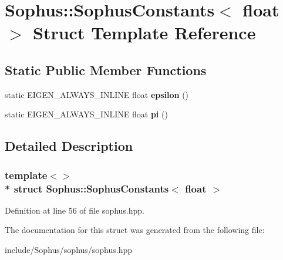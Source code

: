 \hypertarget{struct_sophus_1_1_sophus_constants_3_01float_01_4}{}\section{Sophus\+:\+:Sophus\+Constants$<$ float $>$ Struct Template Reference}
\label{struct_sophus_1_1_sophus_constants_3_01float_01_4}
\subsection*{Static Public Member Functions}
\begin{DoxyCompactItemize}
\item 
static E\+I\+G\+E\+N\+\_\+\+A\+L\+W\+A\+Y\+S\+\_\+\+I\+N\+L\+I\+NE float {\bfseries epsilon} ()\hypertarget{struct_sophus_1_1_sophus_constants_3_01float_01_4_a6d7bc5c5d717c150ea3b1c45554008fb}{}\label{struct_sophus_1_1_sophus_constants_3_01float_01_4_a6d7bc5c5d717c150ea3b1c45554008fb}

\item 
static E\+I\+G\+E\+N\+\_\+\+A\+L\+W\+A\+Y\+S\+\_\+\+I\+N\+L\+I\+NE float {\bfseries pi} ()\hypertarget{struct_sophus_1_1_sophus_constants_3_01float_01_4_a695f77dcbc40d6c4a2236b53756f398c}{}\label{struct_sophus_1_1_sophus_constants_3_01float_01_4_a695f77dcbc40d6c4a2236b53756f398c}

\end{DoxyCompactItemize}


\subsection{Detailed Description}
\subsubsection*{template$<$$>$\\*
struct Sophus\+::\+Sophus\+Constants$<$ float $>$}



Definition at line 56 of file sophus.\+hpp.



The documentation for this struct was generated from the following file\+:\begin{DoxyCompactItemize}
\item 
include/\+Sophus/sophus/sophus.\+hpp\end{DoxyCompactItemize}
